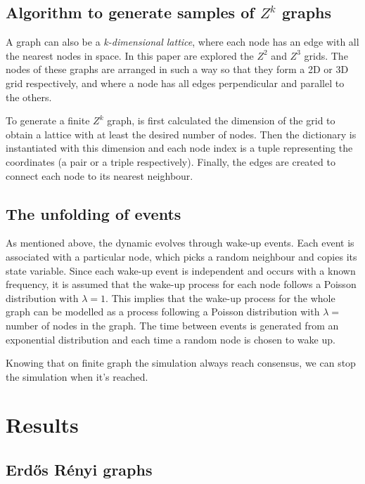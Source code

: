 \documentclass[conference]{IEEEtran}
\begin{document}
    \subsection{Algorithm to generate samples of $Z^k$ graphs}

        A graph can also be a \textit{k-dimensional lattice}, where each node has an edge with all the nearest nodes in space. 
        In this paper are explored the $Z^2$ and $Z^3$ grids. 
        The nodes of these graphs are arranged in such a way so that they form a 2D or 3D grid respectively, and where a node has all edges perpendicular and parallel to the others.

        To generate a finite $Z^k$ graph, is first calculated the dimension of the grid to obtain a lattice with at least the desired number of nodes.
        Then the dictionary is instantiated with this dimension and each node index is a tuple representing the coordinates (a pair or a triple respectively).
        Finally, the edges are created to connect each node to its nearest neighbour. 

    \subsection{The unfolding of events}

        As mentioned above, the dynamic evolves through wake-up events.
        Each event is associated with a particular node, which picks a random neighbour and copies its state variable. 
        Since each wake-up event is independent and occurs with a known frequency, it is assumed that the wake-up process for each node follows a Poisson distribution with $\lambda = 1$. 
        This implies that the wake-up process for the whole graph can be modelled as a process following a Poisson distribution with $\lambda =$ number of nodes in the graph.
        The time between events is generated from an exponential distribution and each time a random node is chosen to wake up.

        Knowing that on finite graph the simulation always reach consensus, we can stop the simulation when it's reached. 

\section{Results}

    \subsection{Erdős Rényi graphs}
\end{document}
